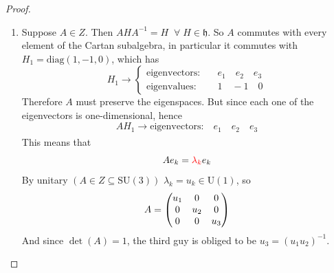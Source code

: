 \documentclass[../main.tex]{subfiles}
\begin{document}
\begin{proof}
\begin{enumerate}
    \item Suppose $A\in Z$. Then $AHA^{-1}=H\;\;\forall\;H\in\mathfrak{h}$. So $A$ commutes with every element of the Cartan subalgebra, in particular it commutes with $H_1=\textrm{diag}(1,-1,0)$, which has
    \[
    H_1\xrightarrow[]{}
    \begin{cases}
       \textrm{eigenvectors:}\quad & e_1\quad e_2 \quad e_3\\
       \textrm{eigenvalues:}\quad & 1\quad -1\quad 0
    \end{cases}
    \]
    Therefore $A$ must preserve the eigenspaces. But since each one of the eigenvectors is one-dimensional, hence
    \[
    AH_1\xrightarrow[]{}\textrm{eigenvectors:} \quad e_1\quad e_2\quad e_3
    \]
    This means that
    \[
    Ae_k={\color{red}\lambda_k}e_k
    \]
    By unitary $(A\in Z\subseteq \textrm{SU}(3))$ $\lambda_k=u_k\in\textrm{U}(1)$, so
    \[
    A=\mqty(\dmat[0]{u_1,u_2,u_3})
    \]
    And since $\det(A)=1$, the third guy is obliged to be $u_3=\left(u_1u_2\right)^{-1}$.
    

\end{enumerate}
\end{proof}
\end{document}
